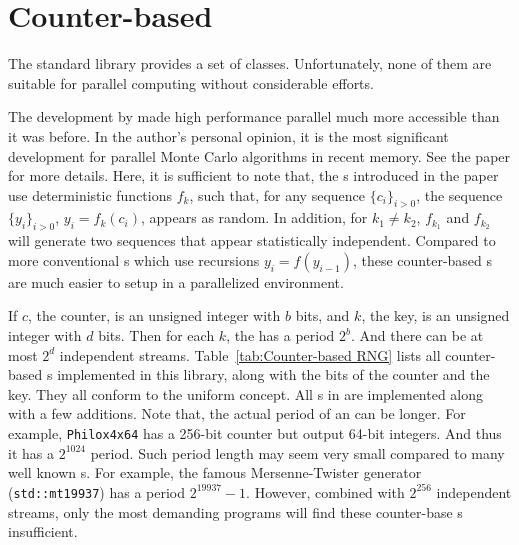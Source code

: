\section{Counter-based \protect\rng}
\label{sec:Counter-based RNG}

The standard library provides a set of \rng classes. Unfortunately, none of
them are suitable for parallel computing without considerable efforts.

The development by \textcite{Salmon:2011um} made high performance parallel \rng
much more accessible than it was before. In the author's personal opinion, it
is the most significant development for parallel Monte Carlo algorithms in
recent memory. See the paper for more details. Here, it is sufficient to
note that, the \rng{}s introduced in the paper use deterministic functions
$f_k$, such that, for any sequence $\{c_i\}_{i>0}$, the sequence
$\{y_i\}_{i>0}$, $y_i = f_k(c_i)$, appears as random. In addition, for $k_1 \ne
k_2$, $f_{k_1}$ and $f_{k_2}$ will generate two sequences that appear
statistically independent. Compared to more conventional \rng{}s which use
recursions $y_i = f(y_{i - 1})$, these counter-based \rng{}s are much easier to
setup in a parallelized environment.

If $c$, the counter, is an unsigned integer with $b$ bits, and $k$, the key, is
an unsigned integer with $d$ bits. Then for each $k$, the \rng has a period
$2^b$. And there can be at most $2^d$ independent streams.
Table~\ref{tab:Counter-based RNG} lists all counter-based \rng{}s implemented
in this library, along with the bits of the counter and the key. They all
conform to the \cppoo uniform \rng concept. All \rng{}s in
\textcite{Salmon:2011um} are implemented along with a few additions. Note that,
the actual period of an \rng can be longer. For example, \verb|Philox4x64| has
a 256-bit counter but output 64-bit integers. And thus it has a $2^{1024}$
period. Such period length may seem very small compared to many well known
\rng{}s. For example, the famous Mersenne-Twister generator
(\verb|std::mt19937|) has a period $2^{19937} - 1$. However, combined with
$2^{256}$ independent streams, only the most demanding programs will find these
counter-base \rng{}s insufficient.

